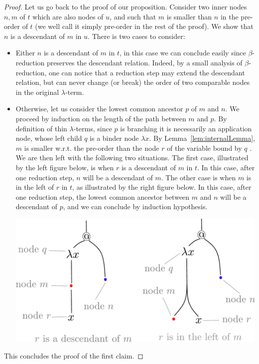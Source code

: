 \begin{proof}
Let us go back to the proof of our proposition. Consider two inner nodes $n, m$ of $t$ which are also nodes of $u$, and such that $m$ is smaller than $n$ in the pre-order of $t$ (we well call it simply pre-order in the rest of the proof). We show that $n$ is a descendant of $m$ in $u$. There is two cases to consider:
\begin{itemize}
\item Either $n$ is a descendant of $m$ in $t$, in this case we can conclude easily since $\beta$-reduction preserves the descendant relation. Indeed, by a small analysis of $\beta$-reduction, one can notice that a reduction step may extend the descendant relation, but can never change (or break) the order of two comparable nodes in the original $\lambda$-term.  
\item  Otherwise, let us consider the lowest common ancestor $p$ of $m$ and $n$. We proceed by induction on the length of the path between $m$ and $p$. By definition of thin $\lambda$-terms, since $p$ is branching it is necessarily an application node, whose left child $q$ is a binder node  $\lambda x$. 
By Lemma~\ref{lem:internalLemma}, $m$ is smaller w.r.t. the pre-order than the node $r$ of the variable bound by $q$ . 
We are then left with the following two situations. The first case, illustrated by the left figure below, is when $r$ is a descendant of $m$ in $t$. In this case, after one reduction step, $n$ will be a descendant of $m$. The other case is when $m$ is in the left of $r$ in $t$, as illustrated by the right figure below. In this case, after one reduction step, the lowest common ancestor between $m$ and $n$ will be a descendant of $p$, and we can conclude by induction hypothesis. 
\begin{center}
\includegraphics[scale=.3]{pictures/cases-lemma}
\end{center}
\end{itemize}
This concludes the proof of the first claim.
\end{proof}

